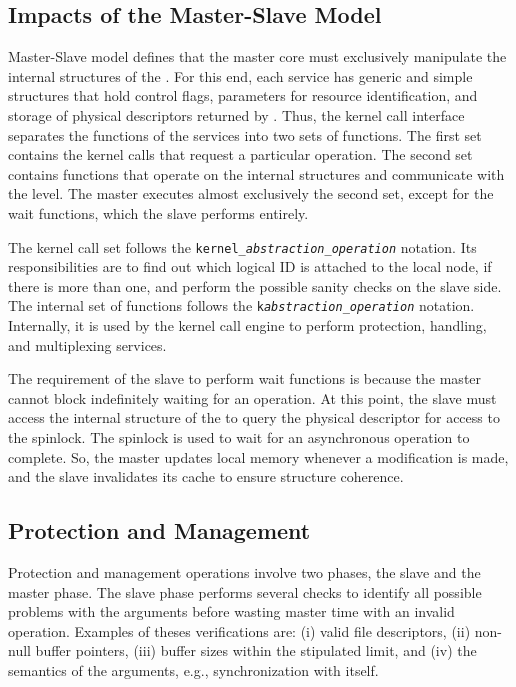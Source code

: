 		\subsection{Impacts of the Master-Slave Model}

			Master-Slave \os model defines that the master core must exclusively manipulate
			the internal structures of the \os. For this end, each service has generic and
			simple structures that hold control flags, parameters for resource
			identification, and storage of physical descriptors returned by \hal. Thus,
			the kernel call interface separates the functions of the services into two
			sets of functions. The first set contains the kernel calls that request a particular
			operation. The second set contains functions that operate on the internal structures
			and communicate with the \hal level. The master executes almost exclusively
			the second set, except for the wait functions, which the slave performs entirely.

			The kernel call set follows the \texttt{kernel\_\textit{abstraction}\_\textit{operation}}
			notation. Its responsibilities are to find out which logical ID is attached to
			the local node, if there is more than one, and perform the possible sanity
			checks on the slave side. The internal set of functions follows the
			\texttt{k\textit{abstraction}\_\textit{operation}} notation. Internally, it
			is used by the kernel call engine to perform protection, handling, and
			multiplexing services.

			The requirement of the slave to perform wait functions is because the master
			cannot block indefinitely waiting for an operation. At this point, the slave
			must access the internal structure of the \os to query the physical descriptor
			for access to the \hal spinlock. The spinlock is used to wait for an asynchronous
			operation to complete. So, the master updates local memory whenever a modification
			is made, and the slave invalidates its cache to ensure structure coherence.

		\subsection{Protection and Management}

			Protection and management operations involve two phases, the slave
			and the master phase. The slave phase performs several checks to
			identify all possible problems with the arguments before wasting
			master time with an invalid operation. Examples of theses
			verifications are:
			(i) valid file descriptors,
			(ii) non-null buffer pointers,
			(iii) buffer sizes within the stipulated limit, and
			(iv) the semantics of the arguments, e.g., synchronization with itself.

